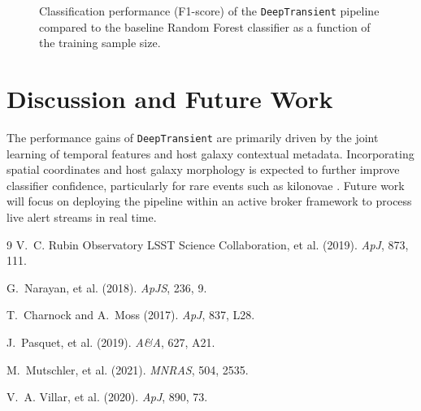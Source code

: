 \documentclass[11pt]{article}
\begin{document}
\begin{figure}[htbp]
\centering
{}
\caption{Classification performance (F1-score) of the \texttt{DeepTransient} pipeline compared to the baseline Random Forest classifier as a function of the training sample size.}
\label{fig:performance}
\end{figure}

\section{Discussion and Future Work}
The performance gains of \texttt{DeepTransient} are primarily driven by the joint learning of temporal features and host galaxy contextual metadata. Incorporating spatial coordinates and host galaxy morphology is expected to further improve classifier confidence, particularly for rare events such as kilonovae \cite{mutschler2021, villar2020}. Future work will focus on deploying the pipeline within an active broker framework to process live alert streams in real time.

\begin{thebibliography}{9}
V.~C. Rubin Observatory LSST Science Collaboration, et al. (2019).
\newblock \emph{ApJ}, 873, 111.

G.~Narayan, et al. (2018).
\newblock \emph{ApJS}, 236, 9.

T.~Charnock and A.~Moss (2017).
\newblock \emph{ApJ}, 837, L28.

J.~Pasquet, et al. (2019).
\newblock \emph{A\&A}, 627, A21.

M.~Mutschler, et al. (2021).
\newblock \emph{MNRAS}, 504, 2535.

V.~A. Villar, et al. (2020).
\newblock \emph{ApJ}, 890, 73.
\end{thebibliography}
\end{document}
